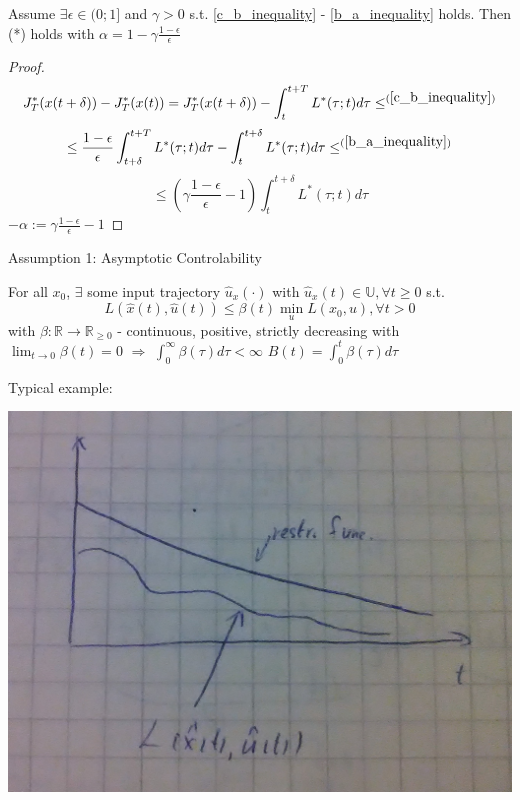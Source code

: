 \begin{Theorem}

Assume $\exists \epsilon \in (0;1]$ and $\gamma > 0$ s.t. \ref{c_b_inequality} - \ref{b_a_inequality} holds. Then (*) holds with $\alpha =1 - \gamma \frac{1-\epsilon}{\epsilon}$

\begin{proof}
\begin{equation*}
J_T^*(x(t+\delta)) - J_T^*(x(t)) = J_T^*(x(t+\delta)) - \int_{t}^{t+T}L^*(\tau;t)d\tau \leq^{(\ref{c_b_inequality})}
\end{equation*}
\begin{equation*}
\leq \frac{1-\epsilon}{\epsilon} \int_{t+\delta}^{t+T}L^*(\tau;t)d\tau - \int_t^{t+\delta}L^*(\tau;t)d\tau \leq^{(\ref{b_a_inequality})}
\end{equation*}
\begin{equation*}
\leq (\gamma \frac{1-\epsilon}{\epsilon} - 1) \int_t^{t+\delta}L^*(\tau;t)d\tau
\end{equation*} 
$-\alpha := \gamma \frac{1-\epsilon}{\epsilon} - 1$ 
\end{proof}
\end{Theorem}

Assumption 1: Asymptotic Controlability

For all $x_0$, $\exists$ some input trajectory $\hat u_x(\cdot)$
with $\hat u_x(t) \in \mathbb{U}, \forall t \geq 0$ s.t.
\begin{equation*}
L(\hat x(t),\hat u(t)) \leq \beta(t) \min_u L(x_0,u), \forall t > 0
\end{equation*}
with $\beta: \mathbb{R} \to \mathbb{R}_{\geq 0}$
 - continuous, positive, strictly decreasing with $\lim_{t \to 0} \beta(t) = 0$ $\Rightarrow$
$\int_0^{\infty}\beta(\tau)d\tau < \infty$
$B(t) = \int_0^t\beta(\tau)d\tau$

Typical example:
\begin{center}
\includegraphics[scale=0.1]{2}
\end{center}

